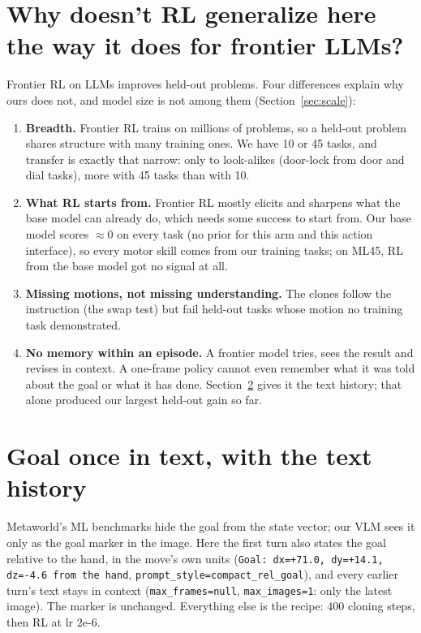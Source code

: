 \documentclass[11pt]{article}
\newcommand{\code}[1]{\texttt{#1}}
\begin{document}
\section{Why doesn't RL generalize here the way it does for frontier LLMs?}
Frontier RL on LLMs improves held-out problems. Four differences explain why ours does not, and model size is not among
them (Section~\ref{sec:scale}):
\begin{enumerate}
\item \textbf{Breadth.} Frontier RL trains on millions of problems, so a held-out problem shares structure with many
  training ones. We have 10 or 45 tasks, and transfer is exactly that narrow: only to look-alikes (door-lock from door and dial
  tasks), more with 45 tasks than with 10.
\item \textbf{What RL starts from.} Frontier RL mostly elicits and sharpens what the base model can already do, which
  needs some success to start from. Our base model scores $\approx$0 on every task (no prior for this arm and this action
  interface), so every motor skill comes from our training tasks; on ML45, RL from the base model got no signal at all.
\item \textbf{Missing motions, not missing understanding.} The clones follow the instruction (the swap test) but fail
  held-out tasks whose motion no training task demonstrated.
\item \textbf{No memory within an episode.} A frontier model tries, sees the result and revises in context. A
  one-frame policy cannot even remember what it was told about the goal or what it has done. Section~\ref{sec:goalhist}
  gives it the text history; that alone produced our largest held-out gain so far.
\end{enumerate}

\section{Goal once in text, with the text history}
\label{sec:goalhist}
Metaworld's ML benchmarks hide the goal from the state vector; our VLM sees it only as the goal marker in the image.
Here the first turn also states the goal relative to the hand, in the move's own units (\code{Goal: dx=+71.0, dy=+14.1,
dz=-4.6 from the hand}, \code{prompt\_style=compact\_rel\_goal}), and every earlier turn's text stays in context
(\code{max\_frames=null}, \code{max\_images=1}: only the latest image). The marker is unchanged. Everything else is the
recipe: 400 cloning steps, then RL at lr 2e-6.
\end{document}
